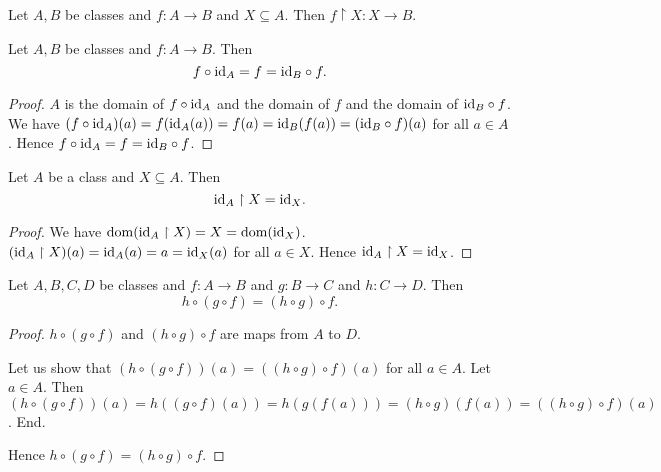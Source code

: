 \documentclass[10pt]{article}
\begin{document}
  \begin{forthel}
    \begin{proposition}
      Let $A, B$ be classes and $f : A \to B$ and $X \subseteq A$.
      Then $f \restriction X : X \to B$.
    \end{proposition}
  \end{forthel}

  \begin{forthel}
    \begin{proposition}
      Let $A, B$ be classes and $f : A \to B$.
      Then \[ f \circ \textrm{id}_{A} = f = \textrm{id}_{B} \circ f. \]
    \end{proposition}
    \begin{proof}
      $A$ is the domain of $f \circ \textrm{id}_{A}$ and the domain of $f$ and the
      domain of $\textrm{id}_{B} \circ f$.
      We have $(f \circ \textrm{id}_{A})(a)
        = f(\textrm{id}_{A}(a))
        = f(a)
        = \textrm{id}_{B}(f(a))
        = (\textrm{id}_{B} \circ f)(a)$
      for all $a \in A$.
      Hence $f \circ \textrm{id}_{A}
        = f
        = \textrm{id}_{B} \circ f$.
    \end{proof}
  \end{forthel}

  \begin{forthel}
    \begin{proposition}
      Let $A$ be a class and $X \subseteq A$.
      Then \[ \textrm{id}_{A} \restriction X = \textrm{id}_{X}. \]
    \end{proposition}
    \begin{proof}
      We have $\operatorname{dom}(\textrm{id}_{A} \restriction X)
        = X
        = \operatorname{dom}(\textrm{id}_{X})$.
      $(\textrm{id}_{A} \restriction X)(a)
        = \textrm{id}_{A}(a)
        = a
        = \textrm{id}_{X}(a)$
      for all $a \in X$.
      Hence $\textrm{id}_{A} \restriction X = \textrm{id}_{X}$.
    \end{proof}
  \end{forthel}

  \begin{forthel}
    \begin{proposition}
      Let $A, B, C, D$ be classes and $f : A \to B$ and $g : B \to C$ and
      $h : C \to D$.
      Then \[ h \circ (g \circ f) = (h \circ g) \circ f. \]
    \end{proposition}
    \begin{proof}
      $h \circ (g \circ f)$ and $(h \circ g) \circ f$ are maps from $A$ to $D$.

      Let us show that $(h \circ (g \circ f))(a) = ((h \circ g) \circ f)(a)$ for
      all $a \in A$.
        Let $a \in A$.
        Then $(h \circ (g \circ f))(a)
          = h((g \circ f)(a))
          = h(g(f(a)))
          = (h \circ g)(f(a))
          = ((h \circ g) \circ f)(a)$.
      End.

      Hence $h \circ (g \circ f) = (h \circ g) \circ f$.
    \end{proof}
  \end{forthel}
\end{document}
